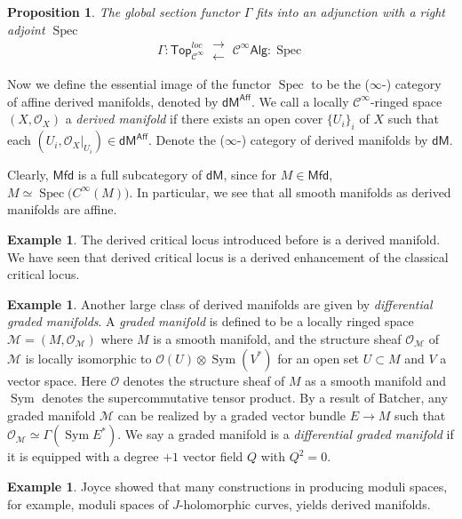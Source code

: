 \documentclass[12pt]{amsart}
\newtheorem{prop}[thm]{Proposition}
\theoremstyle{definition}
\newtheorem{example}[thm]{Example}
\theoremstyle{remark}
\numberwithin{equation}{section}
\newcommand{\CO}{{\mathcal O}}
\newcommand{\cinf}{{\mathcal C}^{\infty}}
\newcommand{\1}{{\mathbb{1}}}
\newcommand{\dm}{\mathsf{dM}}
\newcommand{\mfd}{\mathsf{Mfd}}
\newcommand{\aff}{\mathsf{Aff}}\newcommand{\alg}{\mathsf{Alg}}
\newcommand{\Top}{\mathsf{Top}}
\newcommand{\spec}{\operatorname{Spec}}
\newcommand{\sym}{\operatorname{Sym}}
\begin{document}
\begin{prop}
	The global section functor $\Gamma$ fits into an adjunction with a right adjoint $\spec$ \begin{equation*}
	\Gamma: \Top_{\cinf}^{loc}\  \substack{\longrightarrow\\[-1em]  \longleftarrow}\   \cinf\alg :\spec
	\end{equation*}
\end{prop}

Now we define the essential image of the functor $\spec$ to be the ($\infty$-) category of {affine derived manifolds}, denoted by $\dm^{\aff}$. We call a locally $\cinf$-ringed space $(X,\CO_X)$ a {\it derived manifold} if there exists an open cover $\{U_i\}_i$ of $X$ such that each $(U_i, \CO_X|_{U_i})\in \dm^{\aff}$. Denote the ($\infty$-) category of derived manifolds by $\dm$.

Clearly, $\mfd$ is a full subcategory of $\dm$, since for $M\in\mfd$, $M\simeq \spec\big(C^{\infty}(M) \big)$. In particular, we see that all smooth manifolds as derived manifolds are affine. 

\begin{example}
	The derived critical locus introduced before is a derived manifold. We have seen that derived critical locus is a derived enhancement of the classical critical locus. 
\end{example} 

\begin{example}
	Another large class of derived manifolds are given by {\it differential graded manifolds}. 
	A {\it graded manifold} is defined to be a locally ringed space $\mathcal{M}=(M,\CO_{\mathcal{M}})$ where $M$ is a smooth manifold, and the structure sheaf $\CO_{\mathcal{M}}$ of $\mathcal{M}$ is locally isomorphic to $\CO(U)\otimes \sym (V^*)$ for an open set $U\subset M$ and $V$ a vector space. Here $\CO$ denotes the structure sheaf of $M$ as a smooth manifold and $\sym$ denotes the supercommutative tensor product. By a result of Batcher, any graded manifold $\mathcal{M}$ can be realized by a graded vector bundle $E\to M$ such that $\CO_{\mathcal{M}} \simeq \Gamma (\sym E^*)$. We say a graded manifold is a {\it differential graded manifold} if it is equipped with a degree $+1$ vector field $Q$ with $Q^2=0$.
\end{example}

\begin{example}
	Joyce showed that many constructions in producing moduli spaces, for example, moduli spaces of $J$-holomorphic curves, yields derived manifolds. 
\end{example}
\end{document}

